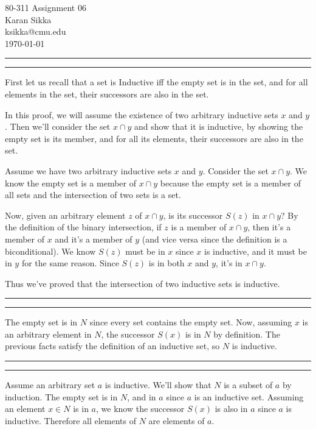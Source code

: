 \documentclass[11pt,letterpaper]{article}
\makeatletter
\newcommand{\question}[1] {\vspace{.25in} \hrule\vspace{0.5em}
\noindent{\bf #1} \vspace{0.5em}
\hrule \vspace{.10in}}
\newcommand{\myname}{Karan Sikka}
\newcommand{\myandrew}{ksikka@cmu.edu}
\newcommand{\myhwnum}{06}
\makeatother
\begin{document}
\medskip

\thispagestyle{plain}
\begin{center}                  %
{\Large 80-311 Assignment \myhwnum} \\
\myname \\
\myandrew \\
\today
\end{center}

\question{1}
First let us recall that a set is Inductive iff the empty set is in the set, and for all elements in the set, their successors are also in the set.

In this proof, we will assume the existence of two arbitrary inductive sets $x$ and $y$. Then we'll consider the set $x \cap y$ and show that it is inductive, by showing the empty set is its member, and for all its elements, their successors are also in the set.

Assume we have two arbitrary inductive sets $x$ and $y$. Consider the set $x \cap y$.
We know the empty set is a member of $x \cap y$ because the empty set is a member of all sets and the intersection of two sets is a set.

Now, given an arbitrary element $z$ of $x \cap y$, is its successor $S(z)$ in $x \cap y$?
By the definition of the binary intersection, if $z$ is a member of $x \cap y$, then it's a member of $x$ and it's a member of $y$ (and vice versa since the definition is a biconditional). We know $S(z)$ must be in $x$ since $x$ is inductive, and it must be in $y$ for the same reason. Since $S(z)$ is in both $x$ and $y$, it's in $x \cap y$.

Thus we've proved that the intersection of two inductive sets is inductive.


\question{2}
The empty set is in $N$ since every set contains the empty set. Now, assuming $x$ is an arbitrary element in $N$, the successor $S(x)$ is in $N$ by definition.
The previous facts satisfy the definition of an inductive set, so $N$ is inductive.

\question{3}
Assume an arbitrary set $a$ is inductive. We'll show that $N$ is a subset of $a$ by induction. The empty set is in $N$, and in $a$ since $a$ is an inductive set. Assuming an element $x \in N$ is in $a$, we know the successor $S(x)$ is also in $a$ since $a$ is inductive. Therefore all elements of $N$ are elements of $a$.
\end{document}
